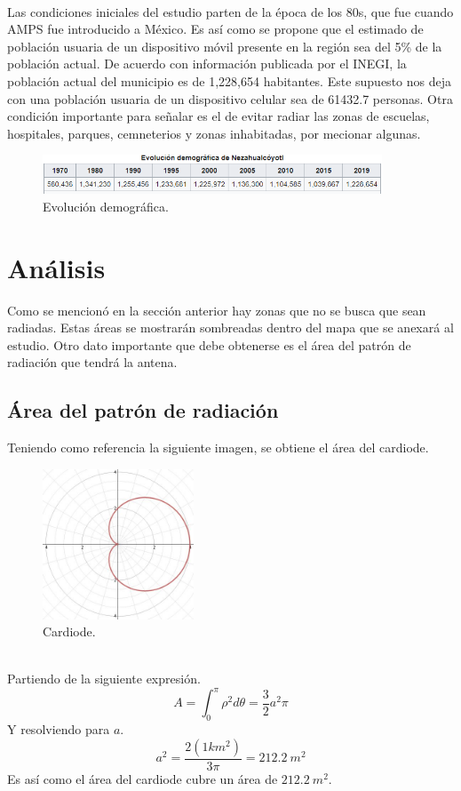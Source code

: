 \documentclass[11pt,letterpaper]{article}
\begin{document}
\\
Las condiciones iniciales del estudio parten de la época de los 80s, que fue cuando AMPS fue 
introducido a México. Es así como se propone que el estimado de población usuaria de un 
dispositivo móvil presente en la región sea del 5\% de la población actual. De acuerdo con 
información publicada por el INEGI, la población actual del municipio es de 1,228,654 
habitantes. Este supuesto nos deja con una población usuaria de un dispositivo celular sea 
de 61432.7 personas. Otra condición importante para señalar es el de evitar radiar las zonas 
de escuelas, hospitales, parques, cemneterios y zonas inhabitadas, por mecionar algunas. 
\begin{figure}[ht]
    \centering
    \includegraphics[width=0.9\textwidth]{imagenes/t21.png}
    \caption{Evolución demográfica.}
\end{figure}

\section{Análisis}
Como se mencionó en la sección anterior hay zonas que no se busca que sean radiadas. Estas 
áreas se mostrarán sombreadas dentro del mapa que se anexará al estudio. Otro dato importante 
que debe obtenerse es el área del patrón de radiación que tendrá la antena.  

\subsection{Área del patrón de radiación}
Teniendo como referencia la siguiente imagen, se obtiene el área del cardiode.
\begin{figure}[ht]
    \centering
    \includegraphics[width=0.4\textwidth]{imagenes/t22.jpg}
    \caption{Cardiode.}
\end{figure}
\\
Partiendo de la siguiente expresión.
\begin{equation}
    A=\int_{0}^{\pi} \rho^2 d\theta = \frac{3}{2} a^2 \pi
\end{equation}
Y resolviendo para $a$.
\begin{equation}
    a^2=\frac{2(1km^2)}{3\pi}=212.2 \ m^2
\end{equation}
Es así como el área del cardiode cubre un área de $212.2 \ m^2$.
\end{document}
